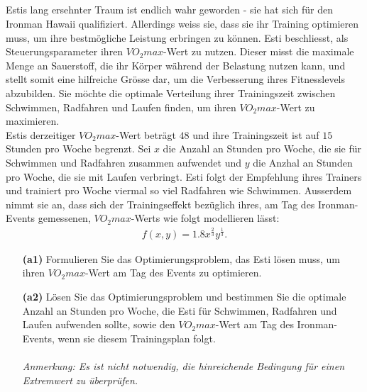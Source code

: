 \subsection*{}
Estis lang ersehnter Traum ist endlich wahr geworden
- 
sie hat sich für den Ironman Hawaii qualifiziert.
Allerdings weiss sie, dass sie ihr Training optimieren muss, um ihre bestmögliche Leistung erbringen zu können.
Esti beschliesst, als Steuerungsparameter ihren $VO_2max$-Wert zu nutzen.
Dieser misst die maximale Menge an Sauerstoff, die ihr Körper während der Belastung nutzen kann, und stellt somit eine hilfreiche Grösse dar, um die Verbesserung ihres Fitnesslevels abzubilden.
Sie möchte die optimale Verteilung ihrer Trainingszeit zwischen
Schwimmen, Radfahren und Laufen finden, um ihren $VO_2max$-Wert zu maximieren.\\
Estis derzeitiger $VO_2max$-Wert beträgt $48$ und ihre Trainingszeit ist auf $15$ Stunden pro Woche begrenzt.
Sei $x$ die Anzahl an Stunden pro Woche, die sie für Schwimmen und Radfahren zusammen aufwendet und $y$ die Anzhal an Stunden pro Woche, die sie mit Laufen verbringt.
Esti folgt der Empfehlung ihres Trainers und trainiert pro Woche viermal so viel Radfahren wie Schwimmen. Ausserdem nimmt sie an, dass sich der Trainingseffekt bezüglich ihres, am Tag des Ironman-Events gemessenen, $VO_2max$-Werts wie folgt modellieren lässt:
\begin{align*}
	f(x,y) = 1.8 x^{\frac{2}{3}} y^{\frac{1}{3}}.
\end{align*}
\begin{enumerate}
	\item[\textbf{(a1)}]
	Formulieren Sie das Optimierungsproblem, das Esti lösen muss, um ihren $VO_2max$-Wert am Tag des Events zu optimieren.
	\item[\textbf{(a2)}] 
	Lösen Sie das Optimierungsproblem und bestimmen Sie die optimale Anzahl an Stunden pro Woche, die Esti für Schwimmen, Radfahren und Laufen aufwenden sollte, sowie den $VO_2max$-Wert am Tag des Ironman-Events, wenn sie diesem Trainingsplan folgt.\\
	\\
	\textit{Anmerkung: Es ist nicht notwendig, die hinreichende Bedingung für einen Extremwert zu überprüfen.}
\end{enumerate}
\ \\
